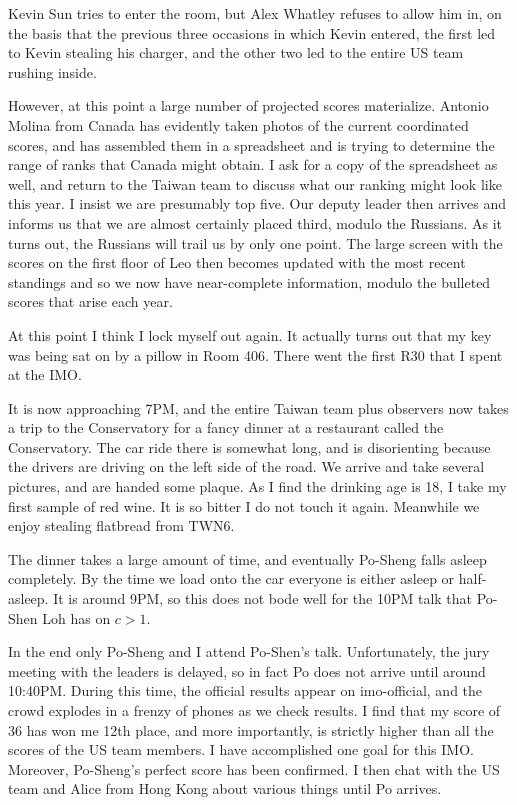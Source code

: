 \documentclass[11pt]{scrreprt}
\numberwithin{figure}{chapter}
\begin{document}
Kevin Sun tries to enter the room, but Alex Whatley refuses to allow him in, on the basis that the previous
three occasions in which Kevin entered, the first led to Kevin stealing his charger, and the other two led
to the entire US team rushing inside.

However, at this point a large number of projected scores materialize.
Antonio Molina from Canada has evidently taken photos of the current coordinated scores,
and has assembled them in a spreadsheet
and is trying to determine the range of ranks that Canada might obtain.
I ask for a copy of the spreadsheet as well, and return to the Taiwan team to discuss what our ranking might look like this year. I insist
we are presumably top five.
Our deputy leader then arrives and informs us that we are almost certainly placed third, modulo the Russians.
As it turns out, the Russians will trail us by only one point.
The large screen with the scores on the first floor of Leo then becomes updated with the most recent standings
and so we now have near-complete information, modulo the bulleted scores that arise each year.

At this point I think I lock myself out again. It actually turns out that my key was being sat on
by a pillow in Room 406. There went the first R30 that I spent at the IMO.

It is now approaching 7PM, and the entire Taiwan team plus observers now takes a trip to the Conservatory
for a fancy dinner at a restaurant called the Conservatory.
The car ride there is somewhat long, and is disorienting because the drivers are driving on the left side
of the road.
We arrive and take several pictures, and are handed some plaque.
As I find the drinking age is 18, I take my first sample of red wine. It is so bitter I do not touch it again.
Meanwhile we enjoy stealing flatbread from TWN6.

The dinner takes a large amount of time, and eventually Po-Sheng falls asleep completely.
By the time we load onto the car everyone is either asleep or half-asleep.
It is around 9PM, so this does not bode well for the 10PM talk that Po-Shen Loh has on $c>1$.

In the end only Po-Sheng and I attend Po-Shen's talk.
Unfortunately, the jury meeting with the leaders is delayed, so in fact Po does not arrive until around 10:40PM.
During this time, the official results appear on imo-official, and the crowd explodes in a frenzy of phones
as we check results.
I find that my score of 36 has won me 12th place, and more importantly, is strictly higher than all the scores
of the US team members. I have accomplished one goal for this IMO.
Moreover, Po-Sheng's perfect score has been confirmed.
I then chat with the US team and Alice from Hong Kong about various things until Po arrives.
\end{document}
